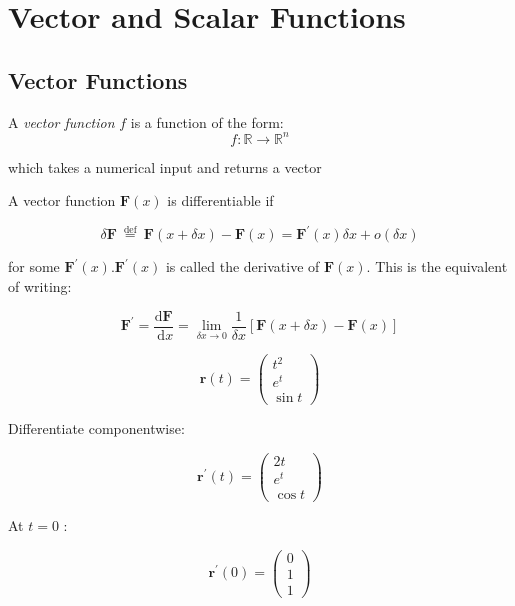 \section{Vector and Scalar Functions}

\subsection{Vector Functions}

\begin{ndefi}
	A  \emph{vector function} $f$ is a function of the form:
	$$
	f: \mathbb{R} \rightarrow \mathbb{R}^n
	$$
	
	which takes a numerical input and returns a vector
\end{ndefi}

\begin{ndefi}
	A vector function $\mathbf{F}(x)$ is differentiable if
	
	$$
	\delta \mathbf{F} \stackrel{\text { def }}{=} \mathbf{F}(x+\delta x)-\mathbf{F}(x)=\mathbf{F}^{\prime}(x) \delta x+o(\delta x)
	$$
	
	for some $\mathbf{F}^{\prime}(x) . \mathbf{F}^{\prime}(x)$ is called the derivative of $\mathbf{F}(x)$. This is the equivalent of writing:
	
	$$\mathbf{F}^{\prime}=\frac{\mathrm{d} \mathbf{F}}{\mathrm{~d} x}=\lim _{\delta x \rightarrow 0} \frac{1}{\delta x}[\mathbf{F}(x+\delta x)-\mathbf{F}(x)]$$
\end{ndefi}

\begin{nex}
	$$
	\mathbf{r}(t)=\left(\begin{array}{c}
		t^2 \\
		e^t \\
		\sin t
	\end{array}\right)
	$$
	
	
	Differentiate componentwise:
	
	$$
	\mathbf{r}^{\prime}(t)=\left(\begin{array}{c}
		2 t \\
		e^t \\
		\cos t
	\end{array}\right)
	$$
	
	
	At $t=0$ :
	
	$$
	\mathbf{r}^{\prime}(0)=\left(\begin{array}{l}
		0 \\
		1 \\
		1
	\end{array}\right)
	$$
\end{nex}

